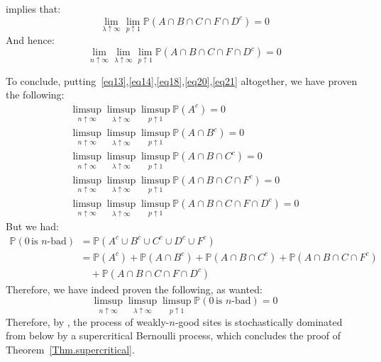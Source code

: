 \documentclass[10pt,a4paper]{amsart}
\theoremstyle{exampstyle}
\theoremstyle{exampnotations}
\begin{document}
implies that:
\begin{equation*}
     \lim_{\lambda \uparrow \infty}\lim_{p \uparrow 1} \mathbb{P}(A \cap B \cap C \cap F \cap D^{c}) = 0
\end{equation*}
And hence:
\begin{equation}
    \label{eq21}
    \lim_{n \uparrow \infty}\lim_{\lambda \uparrow \infty}\lim_{p \uparrow 1} \mathbb{P}(A \cap B \cap C \cap F \cap D^{c}) = 0
\end{equation}

To conclude, putting~\eqref{eq13},\eqref{eq14},\eqref{eq18},\eqref{eq20},\eqref{eq21} altogether, we have proven the following:
\begin{gather*}
    \limsup_{n \uparrow \infty}\limsup_{\lambda \uparrow \infty}\limsup_{p \uparrow 1} \mathbb{P}(A^c) = 0 
    \\  \limsup_{n \uparrow \infty}\limsup_{\lambda \uparrow \infty}\limsup_{p \uparrow 1}\mathbb{P}(A \cap B^c) = 0 
    \\  \limsup_{n \uparrow \infty}\limsup_{\lambda \uparrow \infty}\limsup_{p \uparrow 1} \mathbb{P}(A \cap B \cap C^c) = 0
  \\  \limsup_{n \uparrow \infty}\limsup_{\lambda \uparrow \infty}\limsup_{p \uparrow 1} \mathbb{P}(A \cap B \cap C \cap F^c) = 0 
  \\  \limsup_{n \uparrow \infty}\limsup_{\lambda \uparrow \infty}\limsup_{p \uparrow 1} \mathbb{P}(A \cap B \cap C \cap F \cap D^{c}) = 0
\end{gather*}
But we had:
\begin{align*}
    \mathbb{P}(0 \, \text{is $n$-bad}) &= \mathbb{P}(A^c \cup B^c \cup C^c \cup D^c \cup F^c)
\\ &= \mathbb{P}(A^c) + \mathbb{P}(A \cap B^c) + \mathbb{P}(A \cap B \cap C^c) + \mathbb{P}(A \cap B \cap C \cap F^c) \\ & \quad + \mathbb{P}(A \cap B \cap C \cap F \cap D^c)
\end{align*}
Therefore, we have indeed proven the following, as wanted:
\begin{equation*}
    \limsup_{n \uparrow \infty}\limsup_{\lambda \uparrow \infty}\limsup_{p \uparrow 1} \mathbb{P}(0 \, \text{is $n$-bad}) = 0
\end{equation*}
Therefore, by \cite[Theorem 0.0]{liggett_domination_1997}, the process of weakly-$n$-good sites is stochastically dominated from below by a supercritical Bernoulli process, which concludes the proof of Theorem~\ref{Thm.supercritical}.
\end{document}
